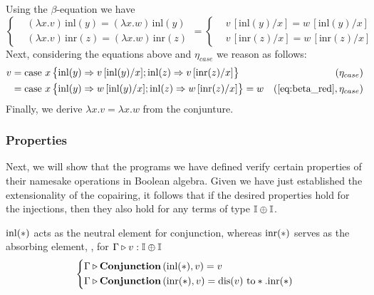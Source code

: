 Using the $\beta$-equation we have
\begin{equation} \label{eq:beta_red}
  \left\{
\begin{aligned}
&(\lambda x.v)\, \text{inl}(y) = (\lambda x.w)\, \text{inl}(y) \\
&(\lambda x.v)\, \text{inr}(z) =(\lambda x.w)\, \text{inr}(z)
\end{aligned}
\right.
= \left\{
\begin{aligned}
&v\,[\text{inl}(y)/x]  = w\, [\text{inl}(y)/x] \\
&v\,[\text{inr}(z)/x]  = w\, [\text{inr}(z)/x] 
\end{aligned}
\right.
\end{equation}
Next, considering the equations above and  $\eta_{case}$ we reason as follows:
\begin{equation*}
\begin{split}
 v &= \text{case } x  
    \left\{ \begin{aligned}
    \inl(y) \Rightarrow v\,[\text{inl}(y)/x] ;  
    \inl(z) \Rightarrow v\,[\text{inr}(z)/x]
  \end{aligned}  \right\} & (\eta_{case})\\
  & = \text{case } x  
    \left\{ \begin{aligned}
    \inl(y) \Rightarrow w\,[\text{inl}(y)/x] ;  
    \inl(z) \Rightarrow w\,[\text{inr}(z)/x]
  \end{aligned}  \right\} = w & (\text{\autoref{eq:beta_red}},\eta_{case})
\end{split}
\end{equation*}
Finally, we derive $ \lambda x.v = \lambda x.w$ from the conjunture.


\vspace{5pt}

\subsubsection{Properties}

Next, we will show that the programs we have defined verify certain properties of their namesake operations in Boolean algebra. Given we have just established the extensionality of the copairing, it follows that if the desired properties hold for the injections, then they also hold for any terms of type $\mathbb{I} \oplus \mathbb{I}$.

  \begin{lemma} \label{lemma:inl_neutral}
     $\mathrm{inl}(*)$ acts as the neutral element for conjunction, whereas $\mathrm{inr}(*)$ serves as the absorbing element, \ie,  for $ \Gamma \triangleright v: \mathbb{I} \oplus \mathbb{I}$
     \[
      \left\{
      \begin{aligned}
      & \Gamma \triangleright \textbf{Conjunction} \, (\mathrm{inl}(*),v) = v  \\
      & \Gamma \triangleright \textbf{Conjunction} \, (\mathrm{inr}(*), v) = \text{dis}(v) \text{ to} *. \mathrm{inr}(*)
      \end{aligned}
      \right.
      \]
  \end{lemma}

